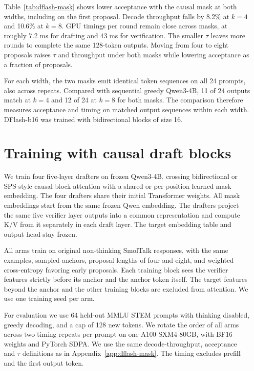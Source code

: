 Table~\ref{tab:dflash-mask} shows lower acceptance with the causal mask
at both widths, including on the first proposal. Decode throughput falls
by 8.2\% at $k=4$ and 10.6\% at $k=8$. GPU timings per round
remain close across masks, at roughly 7.2 ms for drafting and 43 ms for
verification. The smaller $\tau$ leaves more rounds to complete the same
128-token outputs. Moving from four to eight proposals raises $\tau$ and
throughput under both masks while lowering acceptance as a fraction of
proposals.

For each width, the two masks emit identical token sequences on all 24
prompts, also across repeats. Compared with sequential greedy Qwen3-4B,
11 of 24 outputs match at $k=4$ and 12 of 24 at $k=8$ for both masks.
The comparison therefore measures acceptance and timing on matched output
sequences within each width. DFlash-b16 was trained with bidirectional
blocks of size 16.

\section{Training with causal draft blocks}\label{app:trained-draft}
We train four five-layer drafters on frozen Qwen3-4B, crossing
bidirectional or SPS-style causal block attention with a shared or
per-position learned mask embedding. The four drafters share their initial
Transformer weights. All mask embeddings start from the same frozen Qwen
embedding. The drafters project the same five verifier layer outputs into a
common representation and compute K/V from it separately in each draft
layer. The target embedding table and output head stay frozen.

All arms train on original non-thinking SmolTalk responses, with
the same examples, sampled anchors, proposal lengths of four and eight,
and weighted cross-entropy favoring early proposals. Each training block
sees the verifier features strictly before its anchor and the anchor token
itself. The target features beyond the anchor and the other training
blocks are excluded from attention. We use one training seed per arm.

For evaluation we use 64 held-out MMLU STEM prompts with thinking disabled,
greedy decoding, and a cap of 128 new tokens. We rotate the order of all
arms across two timing repeats per prompt on one A100-SXM4-80GB, with
BF16 weights and PyTorch SDPA. We use the same decode-throughput,
acceptance and $\tau$ definitions as in Appendix~\ref{app:dflash-mask}.
The timing excludes prefill and the first output token.


